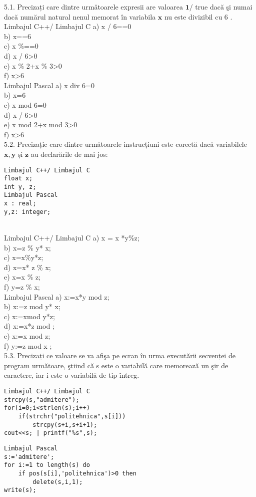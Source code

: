 5.1. Precizați care dintre următoarele expresii are valoarea $\mathbf{1} /$ true dacă şi numai dacă numărul natural nenul memorat în variabila $\mathbf{x}$ nu este divizibil cu 6 .
\\
Limbajul C++/ Limbajul C
a) x / 6==0
\\
b) x==6
\\
c) x \%==0
\\
d) x / 6>0
\\
e) x \% 2+x \% 3>0
\\
f) x>6
\\
Limbajul Pascal
a) x div 6=0
\\
b) x=6
\\
c) x mod 6=0
\\
d) x / 6>0
\\
e) x mod 2+x mod 3>0
\\
f) x>6
\\
5.2. Precizațic care dintre următoarele instrucțiuni este corectă dacă variabilele $\mathbf{x}, \mathbf{y}$ și $\mathbf{z}$ au declarările de mai jos:
\begin{verbatim}
Limbajul C++/ Limbajul C
float x;
int y, z;
Limbajul Pascal
x : real;
y,z: integer;
\end{verbatim}
\\
Limbajul C++/ Limbajul C
a) x = x *y\%z;
\\
b) x=z \% y* x;
\\
c) x=x\%y*z;
\\
d) x=x* z \% x;
\\
e) x=x \% z;
\\
f) y=z \% x;
\\
Limbajul Pascal
a) x:=x*y mod z;
\\
b) x:=z mod y* x;
\\
c) x:=xmod y*z;
\\
d) x:=x*z mod \x;
\\
e) x:=x mod z;
\\
f) y:=z mod x ;
\\
5.3. Precizați ce valoare se va afişa pe ecran în urma executării secvenței de program următoare, ştiind că s este o variabilă care memorează un şir de caractere, iar i este o variabilă de tip întreg.
\begin{verbatim}
Limbajul C++/ Limbajul C
strcpy(s,"admitere");
for(i=0;i<strlen(s);i++)
    if(strchr("politehnica",s[i]))
        strcpy(s+i,s+i+1);
cout<<s; | printf("%s",s);
\end{verbatim}
\begin{verbatim}
Limbajul Pascal
s:='admitere';
for i:=1 to length(s) do
    if pos(s[i],'politehnica')>0 then
        delete(s,i,1);
write(s);
\end{verbatim}
